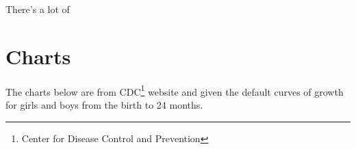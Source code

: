 \documentclass[10pt,twocolumn,letterpaper]{article}
\begin{document}
There's a lot of 

\section{Charts}
The charts below are from CDC\footnote{Center for Disease Control and Prevention} website and given the default curves of growth for girls and boys from the birth to 24 months.




\nocite{*}
{\small


}
\end{document}

